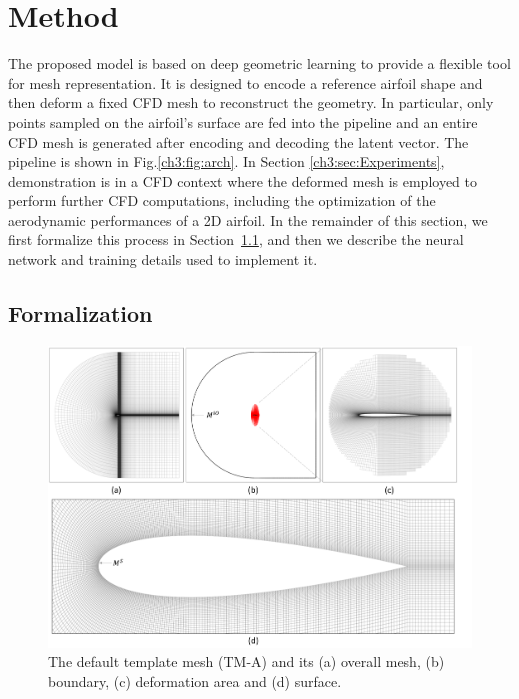 \section{Method}
\label{ch3:sec:method}



The proposed model is based on deep geometric learning to provide a flexible tool for mesh representation.
It is designed to encode a reference airfoil shape and then deform a fixed CFD mesh to reconstruct the geometry. In particular, only points sampled on the airfoil's surface are fed into the pipeline and an entire CFD mesh is generated after encoding and decoding the latent vector.
The pipeline is shown in Fig.\ref{ch3:fig:arch}.
In Section \ref{ch3:sec:Experiments}, demonstration is in a CFD context where the deformed mesh is employed to perform further CFD computations, including the optimization of the aerodynamic performances of a 2D airfoil.  In the remainder of this section, we first formalize this process in Section~\ref{ch3:sec:formal}, and then we describe the neural network and training details used to implement it. 

\subsection{Formalization}
\label{ch3:sec:formal}

\begin{figure}[!tb]
	\begin{center}
		\includegraphics[width=1.01\linewidth]{chapter3/tex/figures/experiment/init_template_mesh_default.pdf}
	\end{center}
	\caption{ \small
		The default template mesh (TM-A) and its (a) overall mesh, (b) boundary, (c) deformation area and (d) surface.
	}
	\label{ch3:fig:exp_default_template}
\end{figure}

